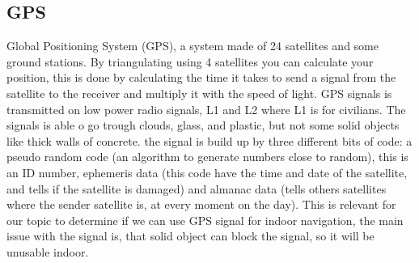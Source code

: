 \subsection{GPS}
Global Positioning System (GPS), a system made of 24 satellites and some ground stations. By triangulating using 4 satellites you can calculate your position, this is done by calculating the time it takes to send a signal from the satellite to the receiver and multiply it with the speed of light. GPS signals is transmitted on low power radio signals, L1 and L2 where L1 is for civilians. The signals is able o go trough clouds, glass, and plastic, but not some solid objects like thick walls of concrete. the signal is build up by three different bits of code: a pseudo random code (an algorithm to generate numbers close to random)\cite{GPS_random}, this is an ID number, ephemeris data (this code have the time and date of the satellite, and tells if the satellite is damaged) and almanac data (tells others satellites where the sender satellite is, at every moment on the day)\cite{GPS_about,GPS_text}. This is relevant for our topic to determine if we  can use GPS signal for indoor navigation, the main issue with the signal is, that solid object can block the signal, so it will be unusable indoor.
